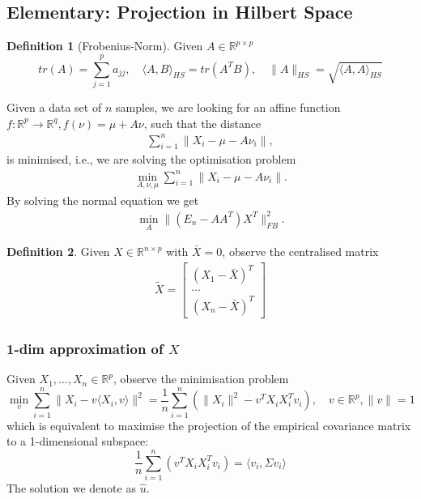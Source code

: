 \documentclass[a4paper,12pt, oneside, fleqn]{book}
\theoremstyle{definition}
\newtheorem{definition}{Definition}[section]
\theoremstyle{remark}
\begin{document}
\subsection{Elementary: Projection in Hilbert Space}
\begin{definition}[Frobenius-Norm]
Given $A \in \mathbb{R}^{p \times p} $
\begin{equation*}
	tr (A) = \sum_{j = 1}^p a_{jj}, \quad \langle A, B \rangle_{HS} = tr(A^TB), \quad \|A\|_{HS} = \sqrt{\langle A, A \rangle_{HS}}
\end{equation*}
\end{definition}
Given a data set of $n$ samples, we are looking for an affine function $f: \mathbb{R}^p \rightarrow \mathbb{R}^q, f(\nu) = \mu + A \nu$, such that the distance
\begin{align*}
	\sum_{i = 1}^n \|X_i - \mu - A\nu_i\|,
\end{align*} 
is minimised, i.e., we are solving the optimisation problem
\begin{align*}
	\min_{A, \nu, \mu} \sum_{i = 1}^n \|X_i - \mu - A\nu_i\|.
\end{align*}
By solving the normal equation we get 
\begin{align*}
	\min_{A}\|(E_n - AA^T)X^T\|_{FB}^2. 
\end{align*}


\begin{definition}
	Given $X \in \mathbb{R}^{n \times p}$ with $\bar{X} = 0$, observe the centralised matrix
	\begin{align*}
		\tilde{X} = 
		\begin{bmatrix}
			(X_1 - \bar{X})^T \\
			\dots\\
			(X_n - \bar{X})^T
		\end{bmatrix}
	\end{align*}
\end{definition}

\subsubsection*{1-dim approximation of $X$}
Given $X_1, \dots, X_n \in \mathbb{R}^p$, observe the minimisation problem
\begin{equation}
	\min_v  \sum_{i = 1}^n \| X_i - v \langle X_i, v \rangle \|^2 = \frac{1}{n} \sum_{i = 1}^n ( \|X_i \|^2 - v^T X_iX_i^T v_i), \quad v \in \mathbb{R}^p, \|v\| = 1
\end{equation}
which is equivalent to maximise the projection of the empirical covariance matrix to a 1-dimensional subspace:
\begin{equation}\label{PCA 1. :OF}
	\frac{1}{n} \sum_{i = 1}^n ( v^T X_iX_i^T v_i) = \langle v_i, \hat{\Sigma} v_i \rangle
\end{equation}
The solution we denote as $\hat{u}$.
\end{document}
